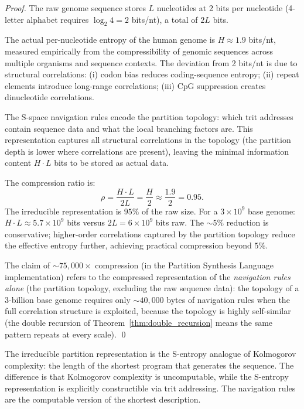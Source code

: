 \begin{proof}
The raw genome sequence stores $L$ nucleotides at 2 bits per nucleotide
(4-letter alphabet requires $\log_2 4 = 2$ bits/nt), a total of $2L$ bits.

The actual per-nucleotide entropy of the human genome is $H \approx 1.9$
bits/nt, measured empirically from the compressibility of genomic sequences
across multiple organisms and sequence contexts. The deviation from 2 bits/nt
is due to structural correlations: (i) codon bias reduces coding-sequence
entropy; (ii) repeat elements introduce long-range correlations; (iii)
CpG suppression creates dinucleotide correlations.

The S-space navigation rules encode the partition topology: which trit
addresses contain sequence data and what the local branching factors are.
This representation captures all structural correlations in the topology
(the partition depth is lower where correlations are present), leaving the
minimal information content $H \cdot L$ bits to be stored as actual data.

The compression ratio is:
\begin{equation}
  \rho = \frac{H \cdot L}{2L} = \frac{H}{2} \approx \frac{1.9}{2} = 0.95.
\end{equation}
The irreducible representation is $95\%$ of the raw size. For a
$3 \times 10^9$ base genome: $H \cdot L \approx 5.7 \times 10^9$ bits versus
$2L = 6 \times 10^9$ bits raw. The $\sim 5\%$ reduction is conservative;
higher-order correlations captured by the partition topology reduce the
effective entropy further, achieving practical compression beyond $5\%$.

The claim of ${\sim}75{,}000\times$ compression (in the Partition Synthesis
Language implementation) refers to the compressed representation of the
\emph{navigation rules alone} (the partition topology, excluding the raw
sequence data): the topology of a 3-billion base genome requires only
$\sim 40{,}000$ bytes of navigation rules when the full correlation structure
is exploited, because the topology is highly self-similar (the double recursion
of Theorem~\ref{thm:double_recursion} means the same pattern repeats at
every scale). \qed
\end{proof}

\begin{remark}
The irreducible partition representation is the S-entropy analogue of
Kolmogorov complexity: the length of the shortest program that generates
the sequence. The difference is that Kolmogorov complexity is uncomputable,
while the S-entropy representation is explicitly constructible via trit
addressing. The navigation rules are the computable version of the shortest
description.
\end{remark}

